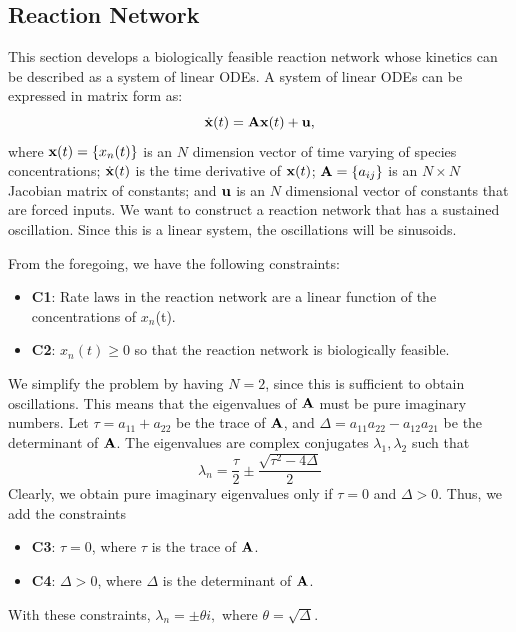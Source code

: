 \documentclass{bmcart}
\begin{document}
\subsection*{Reaction Network}
This section develops a biologically feasible reaction network whose kinetics can be described as a system of linear ODEs. A system of linear ODEs can be expressed in matrix form as: 
\begin{equation}
\dot{{\bf x}}(t) = {\bf A} {\bf x}(t) + {\bf u},
\label{eq:linear}
\end{equation}
where ${\bf x} (t) = \{x_n (t)\}$ is an $N$ 
dimension vector of time varying of 
species concentrations; $\dot {\bf x} (t)$
is the time derivative of ${\bf x}(t)$; ${\bf A} = \{a_{ij} \}$ is an $N \times N$ Jacobian matrix of constants;
and ${\bf u}$ is an $N$ dimensional vector of constants that are forced inputs. We want to construct a reaction network that has a sustained oscillation. Since this is a linear system, the oscillations will be sinusoids.

From the foregoing, we have the following constraints:
\begin{itemize}
    \item {\bf C1}: Rate laws in the reaction network are a linear function of the concentrations of $x_n$(t).
    \item {\bf C2}: $x_n(t) \geq 0$ so that the reaction network is biologically feasible.
\end{itemize}

We simplify the problem by having $N=2$, since this is sufficient to obtain oscillations. This means that the eigenvalues of ${\bf A}$ 
must be pure imaginary numbers. Let $\tau = a_{11} + a_{22}$ be the trace of ${\bf A}$, and 
$\Delta = a_{11} a_{22} - a_{12} a_{21}$ be the
determinant of ${\bf A}$. 
The eigenvalues are complex conjugates $\lambda_1, \lambda_2$ such that
\begin{equation*}
\lambda_n  = \frac{\tau}{2}  \pm \frac{\sqrt{\tau^2 - 4 \Delta}}{2}
\end{equation*}
Clearly, we obtain pure imaginary eigenvalues only if $\tau =  0$ and $\Delta > 0$. Thus, we add the constraints
\begin{itemize}
    \item {\bf C3}: $\tau = 0$, where $\tau$ is the trace of ${\bf A}$.
       \item {\bf C4}: $\Delta > 0$, where $\Delta$ is the determinant of ${\bf A}$.
\end{itemize}
With these constraints, $\lambda_n = \pm \theta i,$ where $\theta = \sqrt{\Delta}.$
\end{document}
